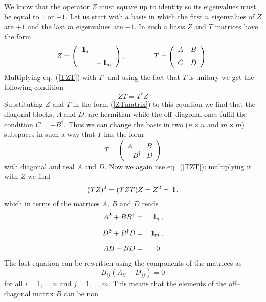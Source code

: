 \documentclass[a4paper,12pt]{article}
\def\id{{\,\,{\rm l}\!\!\!1}}
\begin{document}
We know that the operator $Z$ must square up to identity so its
eigenvalues must be equal to $1$ or $-1$. Let us start with a basis 
in which the first $n$ eigenvalues of $Z$ are $+1$ and the last $m$
eigenvalues are $-1$. In such a basis $Z$ and $T$ matrices have the form
\begin{equation}
Z=
\left(
\begin{array}{cc}
\id_n & 
\\[6pt]
 & -\id_m
\end{array}
\right)
,\qquad\qquad
T=
\left(
\begin{array}{cc}
A & B
\\[6pt]
C & D
\end{array}
\right)
.
\label{ZTmatrix}
\end{equation}
Multiplying eq.\ (\ref{TZT}) with $T^\dagger$ and using the fact that
$T$ is unitary we get the following condition
\begin{equation}
ZT=T^\dagger Z
\end{equation}
Substituting $Z$ and $T$ in the form (\ref{ZTmatrix}) to this equation
we find that the diagonal blocks, $A$ and $D$, are hermitian while the
off--diagonal ones fulfil the condition $C=-B^\dagger$. Thus we can 
change the basis in two ($n\times n$ and $m\times m$) subspaces in
such a way that $T$ has the form  
\begin{equation}
T=\left(
\begin{array}{cc}
A & B
\\[6pt]
-B^\dagger & D
\end{array}
\right)
\end{equation}
with diagonal and real $A$ and $D$. Now we again
use eq.\ (\ref{TZT}); multiplying it with $Z$ we find
\begin{equation}
(TZ)^2=(TZT)Z=Z^2=\id
\,,\label{TZ2}
\end{equation}
which in terms of the matrices $A$, $B$ and $D$ reads
\begin{eqnarray}
A^2+BB^\dagger&=&\id_n
\,,\label{TZ2a}\\[6pt]
D^2+B^\dagger B&=&\id_m
\,,\label{TZ2b}\\[6pt]
AB-BD&=&0
\,.\label{TZ2c}
\end{eqnarray}
The last equation can be rewritten using the components of the
matrices as
\begin{equation}
B_{ij}\left(A_{ii}-D_{jj}\right)=0
\end{equation}
for all $i=1,\ldots,n$ and $j=1,\ldots,m$. This means that the
elements of the off--diagonal matrix $B$ can be non
\end{document}
